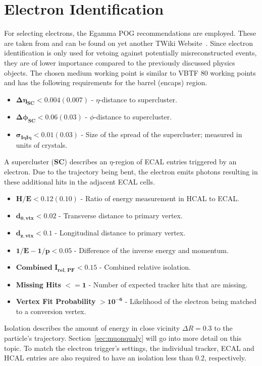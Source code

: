 \section{Electron Identification}
\label{sec:eleid}

For selecting electrons, the Egamma POG recommendations are employed. These are taken from and can be found on yet another TWiki Website~\cite{egammaid}. Since electron identification is only used for vetoing against potentially misreconstructed events, they are of lower importance compared to the previously discussed physics objects. The chosen medium working point is similar to VBTF 80 working points and has the following requirements for the barrel (encaps) region. 


\begin{itemize}
\item $\mathbf{\Delta \eta_{\textbf{SC}} < 0.004 (0.007)}$ - $\eta$-distance to supercluster.
\item $\mathbf{\Delta \phi_{\textbf{SC}} < 0.06 (0.03)}$ - $\phi$-distance to supercluster.
\item $\mathbf{\sigma_{I\eta I\eta} < 0.01 (0.03)}$ - Size of the spread of the supercluster; measured in units of crystals.
\end{itemize}

A supercluster (\textbf{SC}) describes an $\eta$-region of ECAL entries triggered by an electron. Due to the trajectory being bent, the electron emits photons resulting in these additional hits in the adjacent ECAL cells.

\begin{itemize}
\item $\mathbf{H / E < 0.12 (0.10)}$ - Ratio of energy measurement in HCAL to ECAL.
\item $\mathbf{d_{0, \textbf{vtx}} < 0.02}$ - Transverse distance to primary vertex. 
\item $\mathbf{d_{z, \textbf{vtx}} < 0.1}$ - Longitudinal distance to primary vertex.
\item $\mathbf{1/E - 1/p < 0.05}$ - Difference of the inverse energy and momentum.
\item $\mathbf{\textbf{Combined I}_{\textbf{rel, PF}} < 0.15}$ - Combined relative isolation.
\item \textbf{Missing Hits} $\mathbf{<= 1}$ - Number of expected tracker hits that are missing.
\item \textbf{Vertex Fit Probability} $\mathbf{> 10^{-6}}$ - Likelihood of the electron being matched to a conversion vertex.
\end{itemize}

Isolation describes the amount of energy in close vicinity $\Delta R = 0.3$ to the particle's trajectory. Section~\ref{sec:muonqualy} will go into more detail on this topic. To match the electron trigger's settings, the individual tracker, ECAL and HCAL entries are also required to have an isolation less than 0.2, respectively.

